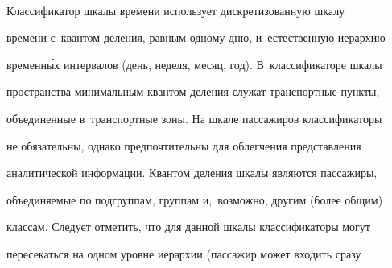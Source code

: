 \pagebreak





\





\vspace*{-12pt}







      


      Классификатор шкалы времени использует дискретизованную шкалу 


времени с~квантом деления, равным одному дню, и~естественную иерархию 


временн\'{ы}х интервалов (день, неделя, месяц, год). В~классификаторе шкалы 


пространства минимальным квантом деления служат транспортные пункты, 


объединенные в~транспортные зоны. На шкале пассажиров классификаторы 


не обязательны, однако предпочтительны для облегчения представления 


аналитической информации. Квантом деления шкалы являются пассажиры, 


объединяемые по подгруппам, группам и,~возможно, другим (более общим) 


классам. Следует отметить, что для данной шкалы классификаторы могут 


пересекаться на одном уровне иерархии (пассажир может входить сразу 


